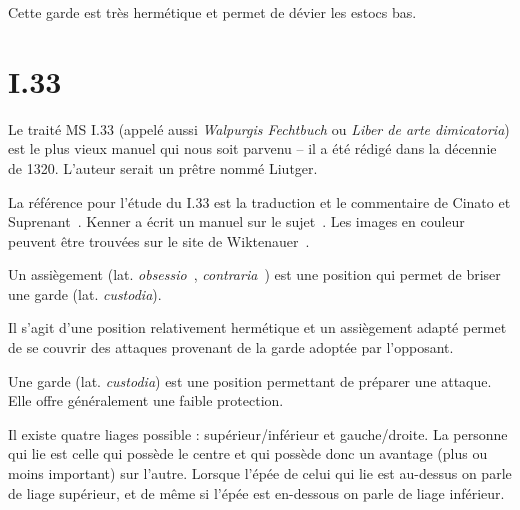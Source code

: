 Cette garde est très hermétique et permet de dévier les estocs bas.


\section{I.33}



Le traité MS I.33 (appelé aussi \emph{Walpurgis Fechtbuch} ou \emph{Liber de arte dimicatoria}) est le plus vieux manuel qui nous soit parvenu – il a été rédigé dans la décennie de 1320.
L'auteur serait un prêtre nommé Liutger.

La référence pour l'étude du I.33 est la traduction et le commentaire de Cinato et Suprenant~\cite{cinato:I33:2009}.
Kenner a écrit un manuel sur le sujet~\cite{kenner:I33:2014}.
Les images en couleur peuvent être trouvées sur le site de Wiktenauer~\cite{wiktenauer:I33}.



\begin{definition}[Assiègement]

Un assiègement (lat. \emph{obsessio}~\cite{cinato:I33:2009}, \emph{contraria}~\cite{kenner:I33:2014}) est une position qui permet de briser une garde (lat. \emph{custodia}).

Il s'agit d'une position relativement hermétique et un assiègement adapté permet de se couvrir des attaques provenant de la garde adoptée par l'opposant.

\end{definition}



\begin{definition}

Une garde (lat. \emph{custodia}) est une position permettant de préparer une attaque.
Elle offre généralement une faible protection.

\end{definition}


Il existe quatre liages possible : supérieur/inférieur et gauche/droite.
La personne qui lie est celle qui possède le centre et qui possède donc un avantage (plus ou moins important) sur l'autre.
Lorsque l'épée de celui qui lie est au-dessus on parle de liage supérieur, et de même si l'épée est en-dessous on parle de liage inférieur.

